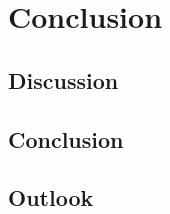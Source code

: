 

\chapter{Conclusion}
\label{ch:Conclusion}

\section{Discussion}
\label{ch:Conclusion:sec:Discussion}


\section{Conclusion}
\label{ch:Conclusion:sec:Conclusion}


\section{Outlook}
\label{ch:Conclusion:sec:Outlook}
